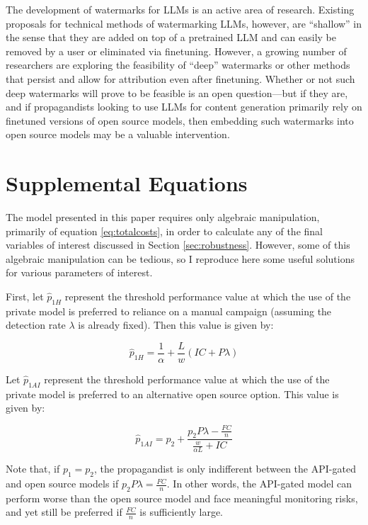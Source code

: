 \documentclass{article}
\begin{document}
The development of watermarks for LLMs is an active area of research. Existing proposals for technical methods of watermarking LLMs, however, are ``shallow'' in the sense that they are added on top of a pretrained LLM and can easily be removed by a user or eliminated via finetuning. \cite{watermark} However, a growing number of researchers are exploring the feasibility of ``deep'' watermarks or other methods that persist and allow for attribution even after finetuning. \cite{deepwatermark, attribution, competition} Whether or not such deep watermarks will prove to be feasible is an open question—but if they are, and if propagandists looking to use LLMs for content generation primarily rely on finetuned versions of open source models, then embedding such watermarks into open source models may be a valuable intervention. 


\newpage 

\appendix
\section{Supplemental Equations}
\label{sec:supplemental}

The model presented in this paper requires only algebraic manipulation, primarily of equation \ref{eq:totalcosts}, in order to calculate any of the final variables of interest discussed in Section \ref{sec:robustness}. However, some of this algebraic manipulation can be tedious, so I reproduce here some useful solutions for various parameters of interest. 

First, let $\hat{p}_{1H}$ represent the threshold performance value at which the use of the private model is preferred to reliance on a manual campaign (assuming the detection rate $\lambda$ is already fixed). Then this value is given by:

\begin{equation}
  \hat{p}_{1H} = \frac{1}{\alpha} + \frac{L}{w} \left( IC + P \lambda \right)
\end{equation}

Let $\hat{p}_{1AI}$ represent the threshold performance value at which the use of the private model is preferred to an alternative open source option. This value is given by:

\begin{equation}
  \hat{p}_{1AI} = p_2 + \frac{p_2 P \lambda - \frac{FC}{n}}{\frac{w}{\alpha L} + IC} 
\end{equation}

Note that, if $p_1 = p_2$, the propagandist is only indifferent between the API-gated and open source models if $p_2 P \lambda = \frac{FC}{n}$. In other words, the API-gated model can perform worse than the open source model and face meaningful monitoring risks, and yet still be preferred if $\frac{FC}{n}$ is sufficiently large.  
\end{document}
